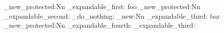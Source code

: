 \cs_new_protected:Nn  %
  \example_expandable_first:
  { foo }
\cs_new_protected:Nn  %
  \example_expandable_second:
  { \prg_do_nothing: }
\cs_new:Nn
  \example_expandable_third:
  { bar }
\cs_new_protected:Nn  %
  \example_expandable_fourth:
  { \example_expandable_third: }
